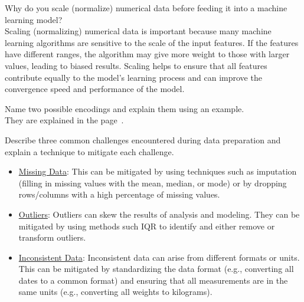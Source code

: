 \begin{ejercicio}
    Why do you scale (normalize) numerical data before feeding it into a machine learning model?\\

    Scaling (normalizing) numerical data is important because many machine learning algorithms are sensitive to the scale of the input features. If the features have different ranges, the algorithm may give more weight to those with larger values, leading to biased results. Scaling helps to ensure that all features contribute equally to the model's learning process and can improve the convergence speed and performance of the model.
\end{ejercicio}

\begin{ejercicio}
    Name two possible encodings and explain them using an example.\\

    They are explained in the page~\pageref{item:encoding}.
\end{ejercicio}

\begin{ejercicio}
    Describe three common challenges encountered during data preparation and explain a technique to mitigate each challenge.
    \begin{itemize}
        \item \ul{Missing Data}: This can be mitigated by using techniques such as imputation (filling in missing values with the mean, median, or mode) or by dropping rows/columns with a high percentage of missing values.
        \item \ul{Outliers}: Outliers can skew the results of analysis and modeling. They can be mitigated by using methods such IQR to identify and either remove or transform outliers.
        \item \ul{Inconsistent Data}: Inconsistent data can arise from different formats or units. This can be mitigated by standardizing the data format (e.g., converting all dates to a common format) and ensuring that all measurements are in the same units (e.g., converting all weights to kilograms). 
    \end{itemize}
\end{ejercicio}


